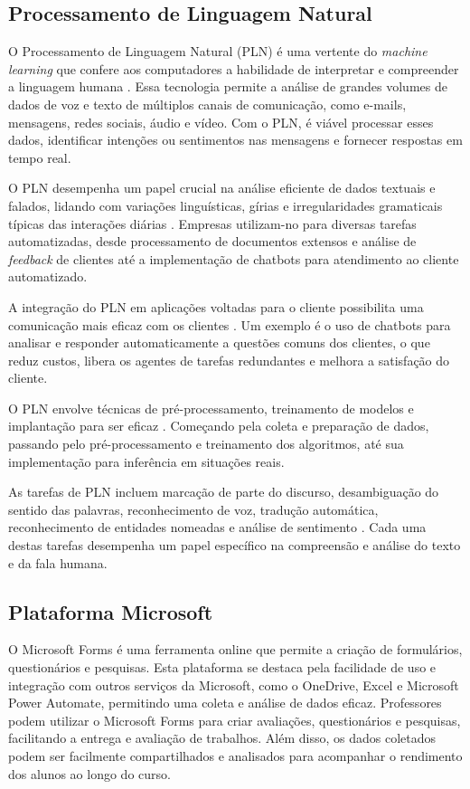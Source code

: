 \subsection{Processamento de Linguagem Natural}

O Processamento de Linguagem Natural (PLN) é uma vertente do \textit{machine learning} que confere aos computadores a habilidade de interpretar e compreender a linguagem humana \cite{amazonnlp2023}. Essa tecnologia permite a análise de grandes volumes de dados de voz e texto de múltiplos canais de comunicação, como e-mails, mensagens, redes sociais, áudio e vídeo. Com o PLN, é viável processar esses dados, identificar intenções ou sentimentos nas mensagens e fornecer respostas em tempo real.

O PLN desempenha um papel crucial na análise eficiente de dados textuais e falados, lidando com variações linguísticas, gírias e irregularidades gramaticais típicas das interações diárias \cite{amazonnlp2023}. Empresas utilizam-no para diversas tarefas automatizadas, desde processamento de documentos extensos e análise de \textit{feedback} de clientes até a implementação de chatbots para atendimento ao cliente automatizado.

A integração do PLN em aplicações voltadas para o cliente possibilita uma comunicação mais eficaz com os clientes \cite{amazonnlp2023}. Um exemplo é o uso de chatbots para analisar e responder automaticamente a questões comuns dos clientes, o que reduz custos, libera os agentes de tarefas redundantes e melhora a satisfação do cliente.

O PLN envolve técnicas de pré-processamento, treinamento de modelos e implantação para ser eficaz \cite{amazonnlp2023}. Começando pela coleta e preparação de dados, passando pelo pré-processamento e treinamento dos algoritmos, até sua implementação para inferência em situações reais.

As tarefas de PLN incluem marcação de parte do discurso, desambiguação do sentido das palavras, reconhecimento de voz, tradução automática, reconhecimento de entidades nomeadas e análise de sentimento \cite{amazonnlp2023}. Cada uma destas tarefas desempenha um papel específico na compreensão e análise do texto e da fala humana.

\subsection{Plataforma Microsoft}

O Microsoft Forms é uma ferramenta online que permite a criação de formulários, questionários e pesquisas. Esta plataforma se destaca pela facilidade de uso e integração com outros serviços da Microsoft, como o OneDrive, Excel e Microsoft Power Automate, permitindo uma coleta e análise de dados eficaz. Professores podem utilizar o Microsoft Forms para criar avaliações, questionários e pesquisas, facilitando a entrega e avaliação de trabalhos. Além disso, os dados coletados podem ser facilmente compartilhados e analisados para acompanhar o rendimento dos alunos ao longo do curso.

